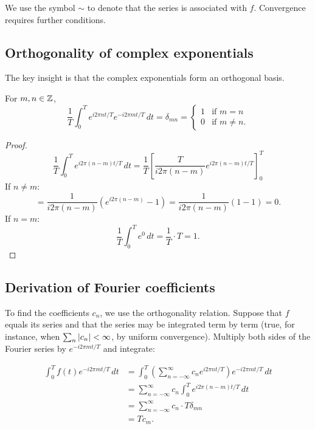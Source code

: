 \begin{notechapter}
\begin{remark}
We use the symbol $\sim$ to denote that the series is associated with $f$. Convergence requires further conditions.
\end{remark}

\subsection{Orthogonality of complex exponentials}

The key insight is that the complex exponentials form an orthogonal basis.

\begin{lemma}[Orthogonality]
For $m, n \in \mathbb{Z}$,
\[
\frac{1}{T}\int_0^T e^{i 2\pi n t/T} e^{-i 2\pi m t/T} \, dt = \delta_{mn} = \begin{cases}
1 & \text{if } m = n \\
0 & \text{if } m \neq n.
\end{cases}
\]
\end{lemma}

\begin{proof}
\[
\frac{1}{T}\int_0^T e^{i 2\pi (n-m) t/T} \, dt = \frac{1}{T} \left[ \frac{T}{i 2\pi (n-m)} e^{i 2\pi (n-m) t/T} \right]_0^T
\]
If $n \neq m$:
\[
= \frac{1}{i 2\pi (n-m)} \left( e^{i 2\pi (n-m)} - 1 \right) = \frac{1}{i 2\pi (n-m)} (1 - 1) = 0.
\]
If $n = m$:
\[
\frac{1}{T}\int_0^T e^{0} \, dt = \frac{1}{T} \cdot T = 1.
\]
\end{proof}

\subsection{Derivation of Fourier coefficients}

To find the coefficients $c_n$, we use the orthogonality relation. Suppose that $f$ equals its series and that the series may be integrated term by term (true, for instance, when $\sum_n \left|c_n\right| < \infty$, by uniform convergence). Multiply both sides of the Fourier series by $e^{-i 2\pi m t/T}$ and integrate:

\begin{align*}
\int_0^T f(t) e^{-i 2\pi m t/T} \, dt &= \int_0^T \left( \sum_{n=-\infty}^{\infty} c_n e^{i 2\pi n t/T} \right) e^{-i 2\pi m t/T} \, dt \\
&= \sum_{n=-\infty}^{\infty} c_n \int_0^T e^{i 2\pi (n-m) t/T} \, dt \\
&= \sum_{n=-\infty}^{\infty} c_n \cdot T \delta_{mn} \\
&= T c_m.
\end{align*}


\end{notechapter}
